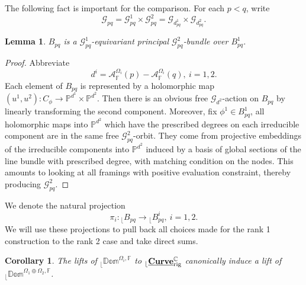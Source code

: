 \documentclass[reqno, 10pt]{amsart}
\numberwithin{equation}{section}
\numberwithin{equation}{section}
\newtheorem{cor}[thm]{Corollary}
\newtheorem{lemma}[thm]{Lemma}
\theoremstyle{definition}
\theoremstyle{remark}
\newcommand{\beqn}{\begin{equation*}}
\newcommand{\eeqn}{\end{equation*}}
\newcommand{\mb}{\mathbb}
\newcommand{\mc}{\mathcal}
\renewcommand{\outer}{{}_{\lfloor}}
\newcommand{\uds}[1]{\underline{\smash{#1}}}
\begin{document}
The following fact is important for the comparison. For each $p<q$, write
\beqn
{\mc G}_{pq} = {\mc G}_{pq}^1 \times {\mc G}_{pq}^2 = {\mc G}_{d_{pq}^1} \times {\mc G}_{d_{pq}^2}.
\eeqn









\begin{lemma}\label{lemma_modification_comparison}
$B_{pq}$ is a ${\mc G}_{pq}^1$-equivariant principal ${\mc G}_{pq}^2$-bundle over $B_{pq}^1$.
\end{lemma}

\begin{proof}
Abbreviate
\beqn
d^i = {\mc A}_{\mb{F}}^{\Omega_i}(p) - {\mc A}_{\mb F}^{\Omega_i}(q),\ i = 1, 2.
\eeqn
Each element of $B_{pq}$ is represented by a holomorphic map $(u^1, u^2): C_\phi \to \mb{P}^{d^1} \times \mb{P}^{d^2}$. Then there is an obvious free ${\mc G}_{d^2}$-action on $B_{pq}$ by linearly transforming the second component. Moreover, fix $\phi^1 \in B_{pq}^1$, all holomorphic maps into ${\mb P}^{d^2}$ which have the prescribed degrees on each irreducible component are in the same free ${\mc G}_{pq}^2$-orbit. They come from projective embeddings of the irreducible components into ${\mb P}^{d^2}$ induced by a basis of global sections of the line bundle with prescribed degree, with matching condition on the nodes. This amounts to looking at all framings with positive evaluation constraint, thereby producing ${\mc G}_{pq}^2$.
\end{proof}

We denote the natural projection
\beqn
\pi_i: \outer B_{pq} \to \outer B_{pq}^i,\ i = 1, 2.
\eeqn
We will use these projections to pull back all choices made for the rank 1 construction to the rank 2 case and take direct sums. 


\begin{cor}
The lifts of $\outer \mb{Dom}^{\Omega_i, {\mb F}}$ to $\outer \uds{\bf Curve}_{\rm rig}^{\mb C}$ canonically induce a lift of $\outer \mb{Dom}^{\Omega_1 \oplus \Omega_2, {\mb F}}$. 
\end{cor}
\end{document}
